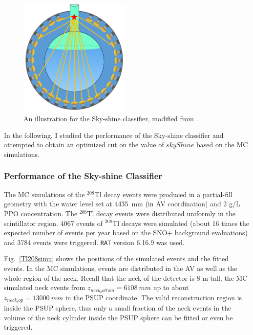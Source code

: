\begin{figure}[!htb]
	\centering
	\includegraphics[width=5.5cm]{skyShine.png}
	\caption{ An illustration for the Sky-shine classifier, modified from \cite{skyshine}.}
	\label{skyshine}
\end{figure}

In the following, I studied the performance of the Sky-shine classifier and attempted to obtain an optimized cut on the value of $skyShine$ based on the MC simulations.

\subsubsection{Performance of the Sky-shine Classifier}
The MC simulations of the $^{208}$Tl decay events were produced in a partial-fill geometry with the water level set at 4435~mm (in AV coordination) and 2 g/L PPO concentration. The $^{208}$Tl decay events were distributed uniformly in the scintillator region. 4067 events of $^{208}$Tl decays were simulated (about 16 times the expected number of events per year based on the SNO+ background evaluations\cite{markchen_bkg}) and 3784 events were triggered. \texttt{RAT} version 6.16.9 was used. 

Fig.~\ref{Tl208simu} shows the positions of the simulated events and the fitted events. In the MC simulations, events are distributed in the AV as well as the whole region of the neck. Recall that the neck of the detector is 8-m tall, the MC simulated neck events from $z_{neck_bottom}=6108~mm$ up to about $z_{neck_top}=13000~mm$ in the PSUP coordinate. The valid reconstruction region is inside the PSUP sphere, thus only a small fraction of the neck events in the volume of the neck cylinder inside the PSUP sphere can be fitted or even be triggered.

